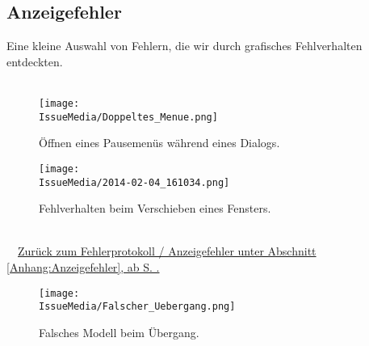 %



\clearpage


	
	
\subsection*{Anzeigefehler}

Eine kleine Auswahl von Fehlern, die wir durch grafisches Fehlverhalten entdeckten.\\~\\


%
%	
%	
%


\begin{figure}[ht]

	\centering
	\label{Anhang:Grafikfehler:Dialog_Pause}
	
	\texttt{[image: \\IssueMedia/Doppeltes\_Menue.png]}
	
	\caption{Öffnen eines Pausemenüs während eines Dialogs.}

\end{figure}

\begin{figure}[ht]

	\centering
	\label{Anhang:Grafikfehler:Fenster_Schieben}
	
	\texttt{[image: \\IssueMedia/2014-02-04\_161034.png]}
	
	\caption{Fehlverhalten beim Verschieben eines Fensters.}

\end{figure}



~\\~\mousecursor~\hyperref[Anhang:Anzeigefehler]{Zurück zum Fehlerprotokoll / Anzeigefehler unter Abschnitt \ref{Anhang:Anzeigefehler}, ab S. \pageref{Anhang:Anzeigefehler}.}


\clearpage



\begin{figure}[ht]

	\centering
	\label{Anhang:Grafikfehler:Falscher_Uebergang}
	
	\texttt{[image: \\IssueMedia/Falscher\_Uebergang.png]}
	
	\caption{Falsches Modell beim Übergang.}

\end{figure}


